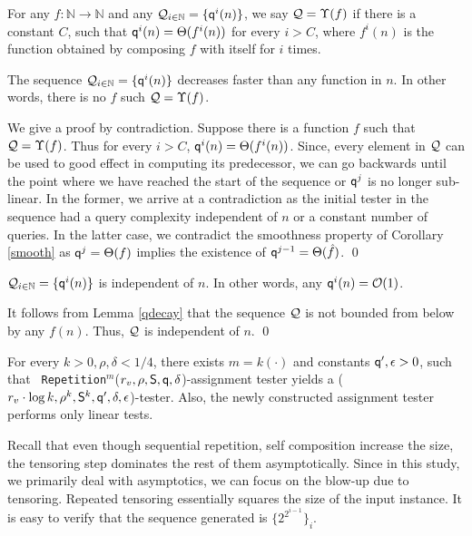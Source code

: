 \begin{definition}[${\cal Q} = \Upsilon(f)$]
  For any $f : \mathbb{N} \rightarrow \mathbb{N}$ and any ${\cal Q}_{i
    \in \mathbb{N}} = \{{\sf q}^{i}(n)\}$, we say ${\cal Q} = \Upsilon(f)$
  if there is a constant $C$, such that ${\sf q}^{i}(n) = \Theta(f^i(n))$
  for every $i > C$, where $f^i(n)$ is the function obtained by
  composing $f$ with itself for $i$ times.
\end{definition}


\begin{lemma}\label{qdecay}
  The sequence ${\cal Q}_{i \in \mathbb{N}} = \{{\sf q}^{i}(n)\}$ decreases
  faster than any function in $n$. In other words, there is no $f$
  such ${\cal Q} = \Upsilon(f)$.
\end{lemma}
 We give a proof by contradiction. Suppose there
is a function $f$ such that ${\cal Q} = \Upsilon(f)$. Thus for every
$i > C$, ${\sf q}^{i}(n) = \Theta(f^i(n))$. Since, every element in ${\cal
  Q}$ can be used to good effect in computing its predecessor, we can
go backwards until the point where we have reached the start of the
sequence or ${\sf q}^j$ is no longer sub-linear. In the former, we arrive
at a contradiction as the initial tester in the sequence had a query
complexity independent of $n$ or a constant number of queries. In the
latter case, we contradict the smoothness property of Corollary
\ref{smooth} as ${\sf q}^j = \Theta({f})$ implies the existence
of ${\sf q}^{j-1} = \Theta(\hat{f})$. \qed

\begin{proposition}\label{constant}
  ${\cal Q}_{i \in \mathbb{N}} = \{{\sf q}^{i}(n)\}$ is independent of
  $n$. In other words, any ${\sf q}^{i}(n) = {\cal O}(1)$.
\end{proposition}
 It follows from Lemma \ref{qdecay} that the
sequence ${\cal Q}$ is not bounded from below by any $f(n)$. Thus,
${\cal Q}$ is independent of $n$. \qed

\begin{theorem}\label{iterateInner}
  For every $k > 0, \rho, \delta < 1/4$, there exists $m = k(\cdot)$ and
  constants ${\sf q}', \epsilon > 0$, such that {\tt
    Repetition}$^m$($r_v, \rho, {\sf S}, {\sf q}, \delta$)-assignment tester yields a ($r_v
  \cdot \log k, \rho^k, {\sf S}^k, {\sf q}', \delta, \epsilon$)-tester. Also, the newly constructed assignment
 tester performs only linear tests.
\end{theorem}
 Recall that even though sequential repetition,
self composition increase the size, the tensoring step dominates the
rest of them asymptotically. Since in this study, we primarily deal
with asymptotics, we can focus on the blow-up due to
tensoring. Repeated tensoring essentially squares the size of the
input instance. It is easy to verify that the sequence generated is
$\{2^{2^{i-1}}\}_{i}$.

